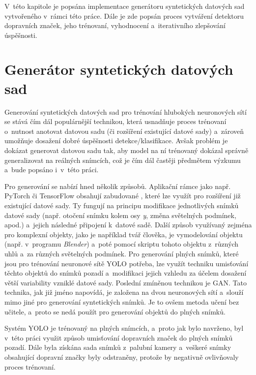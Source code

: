 V~této kapitole je popsána implementace generátoru syntetických datových sad vytvořeného v~rámci této práce. Dále je zde popsán proces vytváření detektoru dopravních značek, jeho trénovaní, vyhodnocení a~iterativního zlepšování úspěšnosti.




\section{Generátor syntetických datových sad}
\label{syntDataset}
Generování syntetických datových sad pro trénování hlubokých neuronových sítí se stává čím dál populárnější technikou, která usnadňuje proces trénovaní o~nutnost anotovat datovou sadu (či rozšíření existující datové sady) a~zároveň umožňuje dosažení dobré úspěšnosti detekce/klasifikace. Avšak problém je dokázat generovat datovou sadu tak, aby model na ní trénovaný dokázal správně generalizovat na reálných snímcích, což je čím dál častěji předmětem výzkumu a~bude popsáno i~v~této práci.

Pro generování se nabízí hned několik způsobů. Aplikační rámce jako např. PyTorch či TensorFlow obsahují zabudované , které lze využít pro rozšíření již existující datové sady. Ty fungují na principu modifikace jednotlivých snímků datové sady (např. otočení snímku kolem osy \emph{y}, změna světelných podmínek, apod.) a~jejich následné připojení k~datové sadě. Další způsob využívaný zejména pro komplexní objekty, jako je například tvář člověka, je vymodelování objektu (např. v~programu \emph{Blender}) a~poté pomocí skriptu  tohoto objektu z~různých uhlů a~za různých světelných podmínek. Pro generování plných snímků, které jsou pro trénování neuronové sítě YOLO potřeba, lze využít techniku umisťování těchto objektů do snímků pozadí a~modifikaci jejich vzhledu za účelem dosažení větší variability vzniklé datové sady. Poslední zmíněnou technikou je GAN\footnotemark. Tato technika, jak již jméno napovídá, je založena na  dvou neuronových sítí a~slouží mimo jiné pro generování syntetických snímků. Je to ovšem metoda učení bez učitele, a~proto se nedá použít pro generování objektů do plných snímků.


Systém YOLO je trénovaný na plných snímcích, a~proto jak bylo navrženo, byl v~této práci využit způsob umisťování dopravních značek do plných snímků pozadí. Dále byla získána sada snímků z~palubní kamery a~veškeré snímky obsahující dopravní značky byly odstraněny, protože by negativně ovlivňovaly proces trénovaní.

